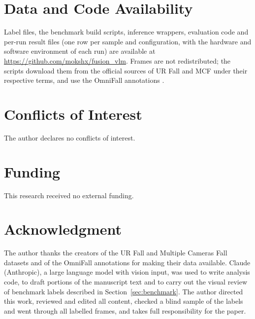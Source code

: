 
\section*{Data and Code Availability}
Label files, the benchmark build scripts, inference wrappers, evaluation code and per-run result files (one row per sample and configuration, with the hardware and software environment of each run) are available at \url{https://github.com/mokshx/fusion_vlm}. Frames are not redistributed; the scripts download them from the official sources of UR Fall \cite{kwolek2014urfall} and MCF \cite{auvinet2010mcfd} under their respective terms, and use the OmniFall annotations \cite{schneider2025omnifall}.

\section*{Conflicts of Interest}
The author declares no conflicts of interest.

\section*{Funding}
This research received no external funding.

\section*{Acknowledgment}
The author thanks the creators of the UR Fall and Multiple Cameras Fall datasets and of the OmniFall annotations for making their data available. Claude (Anthropic), a large language model with vision input, was used to write analysis code, to draft portions of the manuscript text and to carry out the visual review of benchmark labels described in Section~\ref{sec:benchmark}. The author directed this work, reviewed and edited all content, checked a blind sample of the labels and went through all labelled frames, and takes full responsibility for the paper.
